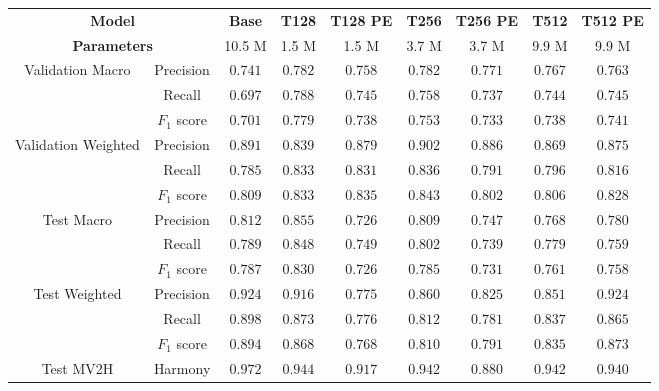 \begin{tabular}{cc|ccccccc}
    \multicolumn{2}{c|}{\textbf{Model}} & \textbf{Base} & \textbf{T128} & \textbf{T128 PE} & \textbf{T256} & \textbf{T256 PE} & \textbf{T512} & \textbf{T512 PE}\\
    \multicolumn{2}{c|}{\textbf{Parameters}} & 10.5 M & 1.5 M & 1.5 M & 3.7 M & 3.7 M & 9.9 M & 9.9 M \\\hline
    \multirow{3}{*}{Validation Macro}    & Precision   & $0.741$          & $\mathbf{0.782}$ & $0.758$ & $\mathbf{0.782}$ & $0.771$ & $0.767$ & $0.763$ \\
    & Recall      & $0.697$          & $\mathbf{0.788}$ & $0.745$ & $0.758$          & $0.737$ & $0.744$ & $0.745$          \\
    & $F_1$ score & $0.701$          & $\mathbf{0.779}$ & $0.738$ & $0.753$          & $0.733$ & $0.738$ & $0.741$          \\\hline
    \multirow{3}{*}{Validation Weighted} & Precision   & $0.891$          & $0.839$          & $0.879$ & $\mathbf{0.902}$ & $0.886$ & $0.869$ & $0.875$ \\
    & Recall      & $0.785$          & $0.833$          & $0.831$ & $\mathbf{0.836}$ & $0.791$ & $0.796$ & $0.816$          \\
    & $F_1$ score & $0.809$          & $0.833$          & $0.835$ & $\mathbf{0.843}$ & $0.802$ & $0.806$ & $0.828$          \\\hline
    \multirow{3}{*}{Test Macro}          & Precision   & $0.812$          & $\mathbf{0.855}$ & $0.726$ & $0.809$          & $0.747$ & $0.768$ & $0.780$ \\
    & Recall      & $0.789$          & $\mathbf{0.848}$ & $0.749$ & $0.802$          & $0.739$ & $0.779$ & $0.759$          \\
    & $F_1$ score & $0.787$          & $\mathbf{0.830}$ & $0.726$ & $0.785$          & $0.731$ & $0.761$ & $0.758$          \\\hline
    \multirow{3}{*}{Test Weighted}       & Precision   & $\mathbf{0.924}$ & $0.916$          & $0.775$ & $0.860$ & $0.825$ & $0.851$ & $\mathbf{0.924}$ \\
    & Recall      & $\mathbf{0.898}$ & $0.873$          & $0.776$ & $0.812$          & $0.781$ & $0.837$ & $0.865$          \\
    & $F_1$ score & $\mathbf{0.894}$ & $0.868$          & $0.768$ & $0.810$          & $0.791$ & $0.835$ & $0.873$          \\\hline
    \multirow{1}{*}{Test MV2H}           & Harmony     & $\mathbf{0.972}$ & $0.944$          & $0.917$ & $0.942$          & $0.880$ & $0.942$ & $0.940$ \\
\end{tabular}